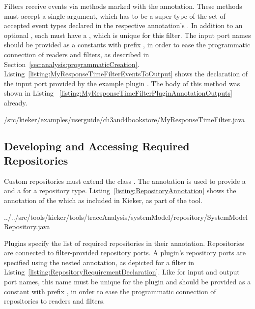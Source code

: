 Filters receive events via methods marked with the  %
annotation. These methods must accept a single argument, which has to be %
a super type of the set of accepted event types declared in the respective %
 annotation's . %
In addition to an optional , each  %
must have a , which is unique for this filter. The input port names %
should be provided as a  constants %
with prefix , in order to ease the programmatic %
connection of readers and filters, as described in %
Section~\ref{sec:analysis:programmaticCreation}. %
Listing~\ref{listing:MyResponseTimeFilterEventsToOutput} shows the declaration %
of the input port provided by the example plugin . %
The body of this method was shown in Listing~%
\ref{listing:MyResponseTimeFilterPluginAnnotationOutputs} already.

\pagebreak

\setJavaCodeListing
%
{\customComponentsBookstoreApplicationDir/src/kieker/examples/userguide/ch3and4bookstore/MyResponseTimeFilter.java}

\subsection{Developing and Accessing Required Repositories}\label{sec:analysis:repositories}

Custom repositories must extend the class . %
The  annotation is used to provide a  %
and a  for a repository type. %
Listing~\ref{listing:RepositoryAnnotation} shows the  annotation %
of the  which as included in Kieker, as part of the %
\KiekerTraceAnalysis{} tool. %

\setJavaCodeListing
%
{../../src/tools/kieker/tools/traceAnalysis/systemModel/repository/SystemModelRepository.java}

\noindent Plugins specify the list of required repositories in their %
 annotation. Repositories are connected to filter-provided %
repository ports. A plugin's repository ports are specified using the %
nested  annotation, as depicted for a %
\KiekerTraceAnalysis{} filter in Listing~\ref{listing:RepositoryRequirementDeclaration}. %
Like for input and output port names, this name must be unique for the plugin %
and should be provided as a  constant %
with prefix , in order to ease the programmatic %
connection of repositories to readers and filters. %

